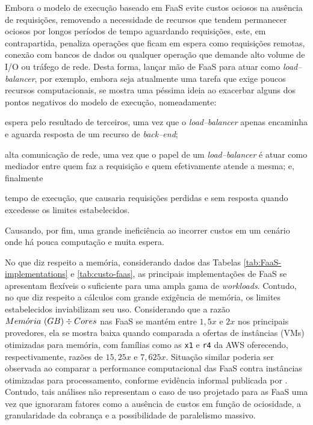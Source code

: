 \documentclass[english,brazilian]{UNISINOSmonografia} %
\begin{document}
Embora o modelo de execução baseado em FaaS evite custos ociosos na ausência de requisições, removendo a necessidade de recursos que tendem permanecer ociosos por longos períodos de tempo aguardando requisições, este, em contrapartida, penaliza operações que ficam em espera como requisições remotas, conexão com bancos de dados ou qualquer operação que demande alto volume de I/O ou tráfego de rede.
%
Desta forma, lançar mão de FaaS para atuar como \textit{load--balancer}, por exemplo, embora seja atualmente uma tarefa que exige poucos recursos computacionais, se mostra uma péssima ideia ao exacerbar alguns dos pontos negativos do modelo de execução, nomeadamente:
\begin{inparaenum}
	\item espera pelo resultado de terceiros, uma vez que o \textit{load--balancer} apenas encaminha e aguarda resposta de um recurso de \textit{back--end};
	~
	\item alta comunicação de rede, uma vez que o papel de um \textit{load--balancer} é atuar como mediador entre quem faz a requisição e quem efetivamente atende a mesma; e, finalmente
	~
	\item tempo de execução, que causaria requisições perdidas e sem resposta quando excedesse os limites estabelecidos.
\end{inparaenum}
Causando, por fim, uma grande ineficiência ao incorrer custos em um cenário onde há pouca computação e muita espera.


No que diz respeito a memória, considerando dados das Tabelas \ref{tab:FaaS-implementations} e \ref{tab:custo-faas}, as principais implementações de FaaS se apresentam flexíveis o suficiente para uma ampla gama de \textit{workloads}.
Contudo, no que diz respeito a cálculos com grande exigência de memória, os limites estabelecidos inviabilizam seu uso.
Considerando que a razão $ Mem\acute{o}ria~{\small (GB)} \div Cores $ nas FaaS se mantém entre $ 1,5x $ e $ 2x $ nos principais provedores, ela se mostra baixa quando comparada a ofertas de instâncias (VMs) otimizadas para memória, com famílias como as \texttt{x1} e \texttt{r4} da AWS oferecendo, respectivamente, razões de $15,25x$ e $7,625x$.
Situação similar poderia ser observada ao comparar a performance computacional das FaaS contra instâncias otimizadas para processamento, conforme evidência informal publicada por \cite{CloudABC}.
Contudo, tais análises não representam o caso de uso projetado para as FaaS uma vez que ignoraram fatores como a ausência de custos em função de ociosidade, a granularidade da cobrança e a possibilidade de paralelismo massivo.
\end{document}
